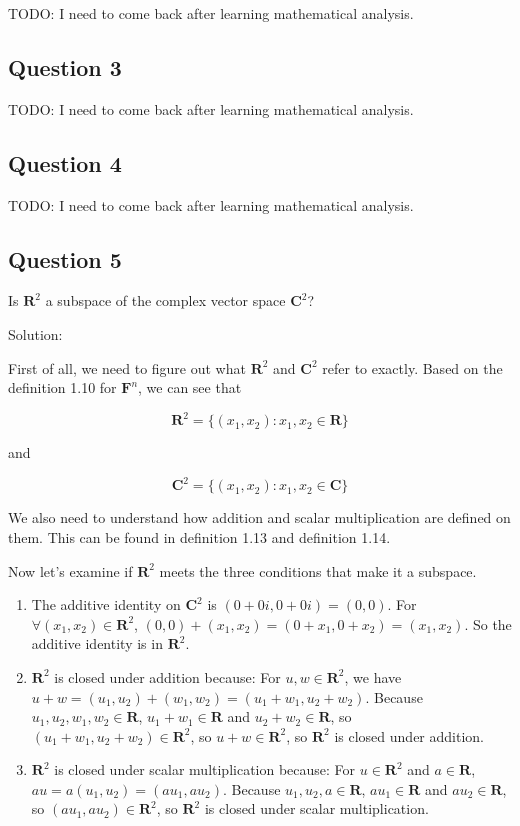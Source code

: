 \documentclass[12pt, letterpaper, oneside]{book}
\begin{document}
TODO: I need to come back after learning mathematical analysis.

\subsection{Question 3}

TODO: I need to come back after learning mathematical analysis.

\subsection{Question 4}

TODO: I need to come back after learning mathematical analysis.

\subsection{Question 5}

Is $\mathbf{R}^2$ a subspace of the complex vector space $\mathbf{C}^2$?

Solution:

First of all, we need to figure out what $\mathbf{R}^2$ and $\mathbf{C}^2$
refer to exactly. Based on the definition 1.10 for $\mathbf{F}^n$, we can see
that

\[
  \mathbf{R}^2 = \{(x_1, x_2): x_1, x_2 \in \mathbf{R} \}
\]

and

\[
  \mathbf{C}^2 = \{(x_1, x_2): x_1, x_2 \in \mathbf{C} \}
\]

We also need to understand how addition and scalar multiplication are defined
on them. This can be found in definition 1.13 and definition 1.14.

Now let's examine if $\mathbf{R}^2$ meets the three conditions that make it a
subspace.

\begin{enumerate}
  \item The additive identity on $\mathbf{C}^2$ is $(0 + 0i, 0 + 0i) = (0, 0)$.
    For $\forall (x_1, x_2) \in \mathbf{R}^2$, $(0, 0) + (x_1, x_2) = (0 + x_1,
    0 + x_2) = (x_1, x_2)$. So the additive identity is in $\mathbf{R}^2$.
  \item $\mathbf{R}^2$ is closed under addition because: For $u, w \in
    \mathbf{R}^2$, we have $u + w = (u_1, u_2) + (w_1, w_2) = (u_1 + w_1, u_2 +
    w_2).$ Because $u_1, u_2, w_1, w_2 \in \mathbf{R}$, $u_1 + w_1 \in
    \mathbf{R}$ and $u_2 + w_2 \in \mathbf{R}$, so $(u_1 + w_1, u_2 + w_2) \in
    \mathbf{R}^2$, so $u + w \in \mathbf{R}^2$, so $\mathbf{R}^2$ is closed
    under addition.
  \item $\mathbf{R}^2$ is closed under scalar multiplication because: For $u
    \in \mathbf{R}^2$ and $a \in \mathbf{R}$, $au = a(u_1, u_2) = (a u_1,
    a u_2)$. Because $u_1, u_2, a \in \mathbf{R}$, $a u_1 \in \mathbf{R}$ and
    $a u_2 \in \mathbf{R}$, so $(a u_1, a u_2) \in \mathbf{R}^2$, so
    $\mathbf{R}^2$ is closed under scalar multiplication.
\end{enumerate}
\end{document}
